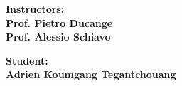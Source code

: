 \begin{titlepage}
\begin{minipage}[t]{0.47\textwidth}
	{\large{\textbf{Instructors:\\ Prof. Pietro Ducange \\ Prof. Alessio Schiavo}}}
\end{minipage}
\hfill
\begin{minipage}[t]{0.47\textwidth}\raggedleft
	{\large{\textbf{Student: \\ Adrien Koumgang Tegantchouang}}}
\end{minipage}

\vspace{20mm}


\end{titlepage}
